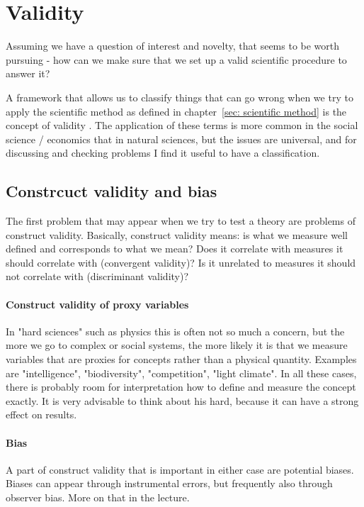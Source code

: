 \documentclass{tufte-book}
\begin{document}
\section{Validity}

Assuming we have a question of interest and novelty, that seems to be worth pursuing - how can we make sure that we set up a valid scientific procedure to answer it?


A framework that allows us to classify things that can go wrong when we try to apply the scientific method as defined in chapter~\ref{sec: scientific method} is the concept of validity \citep[][]{Shadish-Experimentalandquasi-2002}. The application of these terms is more common in the social science / economics that in natural sciences, but the issues are universal, and for discussing and checking problems I find it useful to have a classification. 

\subsection{Constrcuct validity and bias}

The first problem that may appear when we try to test a theory are problems of construct validity. Basically, construct validity means: is what we measure well defined and corresponds to what we mean? Does it correlate with measures it should correlate with (convergent validity)? Is it unrelated to measures it should not correlate with (discriminant validity)?

\paragraph{Construct validity of proxy variables} In "hard sciences" such as physics this is often not so much a concern, but the more we go to complex or social systems, the more likely it is that we measure variables that are proxies for concepts rather than a physical quantity. Examples are "intelligence", "biodiversity", "competition", "light climate". In all these cases, there is probably room for interpretation how to define and measure the concept exactly. It is very advisable to think about his hard, because it can have a strong effect on results. 

\paragraph{Bias} A part of construct validity that is important in either case are potential biases. Biases can appear through instrumental errors, but frequently also through observer bias. More on that in the lecture. 
\end{document}
